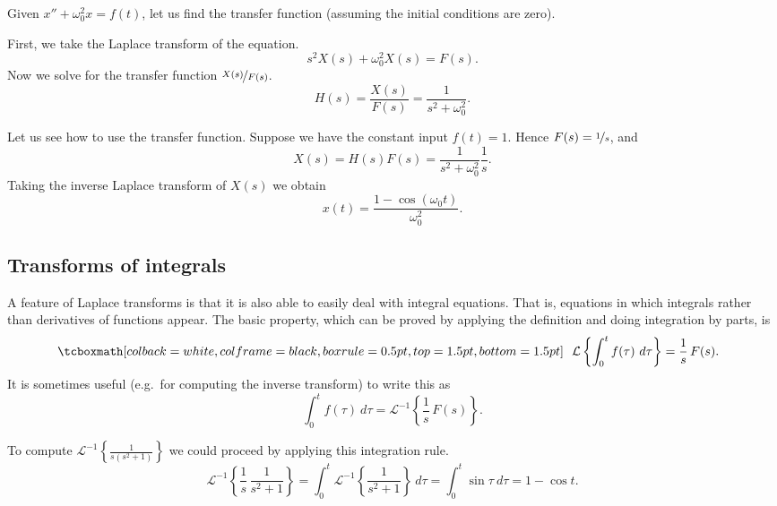 \begin{example}
Given $x'' + \omega_0^2 x = f(t)$, let us find the transfer function
(assuming the initial conditions are zero).

First, we take the Laplace transform of the equation.
\begin{equation*}
s^2 X(s) + \omega_0^2 X(s) = F(s) .
\end{equation*}
Now we solve for the transfer function $\nicefrac{X(s)}{F(s)}$.
\begin{equation*}
H(s) = \frac{X(s)}{F(s)} = \frac{1}{s^2 + \omega_0^2} .
\end{equation*}

Let us see how to use the transfer function.  Suppose we have the constant input
$f(t) = 1$.  Hence $F(s) = \nicefrac{1}{s}$, and
\begin{equation*}
X(s) = H(s) F(s) = \frac{1}{s^2+\omega_0^2} \frac{1}{s} .
\end{equation*}
Taking the inverse Laplace transform of $X(s)$ we obtain
\begin{equation*}
x(t) = \frac{1-\cos(\omega_0 t)}{\omega_0^2} .
\end{equation*}
\end{example}

\subsection{Transforms of integrals}

A feature of Laplace transforms is that it is also able to easily deal
with integral equations.  That is, equations in which integrals rather than
derivatives of functions appear.  The basic property, which can be proved
by applying the definition and doing integration by parts, is 
\begin{equation*}
\mybxbg{~~
\mathcal{L} \left\{
\int_0^t f(\tau) ~ d\tau
\right\} = \frac{1}{s} \, F(s) .
~~}
\end{equation*}
It is sometimes useful (e.g.\ for computing the inverse transform) to write
this as
\begin{equation*}
\int_0^t f(\tau) ~ d\tau
=
{\mathcal{L}}^{-1} \left\{
\frac{1}{s} \, F(s) \right\} .
\end{equation*}

\begin{example}
To compute ${\mathcal{L}}^{-1} \left\{\frac{1}{s(s^2+1)}\right\}$ we could
proceed by applying this integration rule.  
\begin{equation*}
{\mathcal{L}}^{-1} \left\{
\frac{1}{s} \, \frac{1}{s^2+1} \right\} 
=
\int_0^t 
{\mathcal{L}}^{-1} \left\{
\frac{1}{s^2+1} \right\} ~ d\tau
=
\int_0^t 
\sin \tau ~ d\tau
=
1 - \cos t .
\end{equation*}
\end{example}

